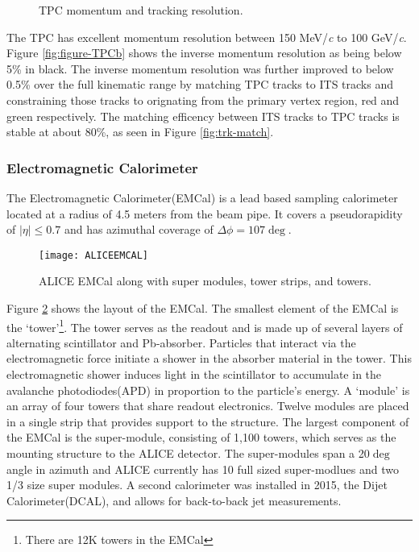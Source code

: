 \begin{figure}[h]
   \centering
   \caption{TPC momentum and tracking resolution\cite{Abelev:2014ffa}.}
   \label{fig:multipart-TPC}
\end{figure}

\noindent
The TPC has excellent momentum resolution between 150 MeV/\textit{c} to 100 GeV/\textit{c}\cite{LIPPMANN2012434}.  Figure \ref{fig:figure-TPCb} shows the inverse momentum resolution as being below 5\% in black.  The inverse momentum resolution was further improved to below 0.5\% over the full kinematic range by matching TPC tracks to ITS tracks and constraining those tracks to orignating from the primary vertex region, red and green respectively.  The matching efficency between ITS tracks to TPC tracks is stable at about 80\%, as seen in Figure \ref{fig:trk-match}.




\subsubsection{Electromagnetic Calorimeter}
The Electromagnetic Calorimeter(EMCal)\cite{1742-6596-293-1-012043} is a lead based sampling calorimeter located at a radius of 4.5 meters from the beam pipe.  It covers a pseudorapidity of $ \left | \eta \right | \leq 0.7$ and has azimuthal coverage of $ \Delta \phi = 107 \deg$.

\begin{figure}[h]
\texttt{[image: ALICEEMCAL]}
\centering
\caption{ALICE EMCal along with super modules, tower strips, and towers\cite{1742-6596-110-3-032006}.}
\label{fig:EMCal}
\end{figure}


Figure \ref{fig:EMCal} shows the layout of the EMCal.  The smallest element of the EMCal is the `tower'\footnote{There are 12K towers in the EMCal}.  The tower serves as the readout and is made up of several layers of alternating scintillator and Pb-absorber.  Particles that interact via the electromagnetic force initiate a shower in the absorber material in the tower.  This electromagnetic shower induces light in the scintillator  to accumulate in the avalanche photodiodes(APD) in proportion to the particle's energy.  A `module' is an array of four towers that share readout electronics.  Twelve modules are placed in a single strip that provides support to the structure.  The largest component of the EMCal is the super-module, consisting of 1,100 towers,  which serves as the mounting structure to the ALICE detector.  The super-modules span a 20$\deg$ angle in azimuth and ALICE currently has 10 full sized super-modlues and two 1/3 size super modules.  A second calorimeter was installed in 2015, the Dijet Calorimeter(DCAL), and allows for back-to-back jet measurements.


